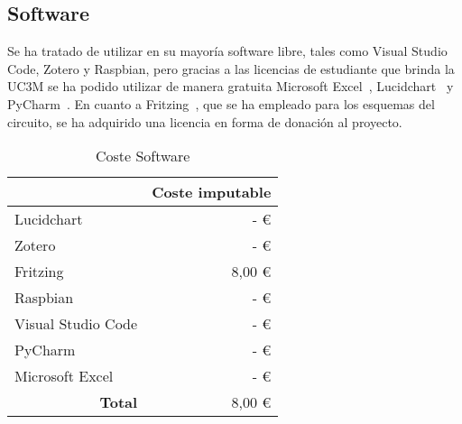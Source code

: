 \subsection{Software}\label{subsec:software}
Se ha tratado de utilizar en su mayoría software libre, tales como Visual Studio Code, Zotero y Raspbian, pero gracias a las licencias de estudiante que brinda la UC3M se ha podido utilizar de manera gratuita Microsoft Excel~\cite{microsoft_microsoft_nodate}, Lucidchart~\cite{lucidchart_usecase_nodate} y PyCharm~\cite{jetbrains_free_nodate}. En cuanto a Fritzing~\cite{fritzing_fritzing_nodate}, que se ha empleado para los esquemas del circuito, se ha adquirido una licencia en forma de donación al proyecto.

\begin{table}[H]
	\centering
	\caption{Coste Software}
	\label{tab:coste_software}
	\begin{tabular}{l|r|}
		\hline
		\rowcolor[HTML]{BFBFBF}
		\multicolumn{1}{|c|}{\cellcolor[HTML]{BFBFBF}\textbf{Descripción}} & \multicolumn{1}{c|}{\cellcolor[HTML]{BFBFBF}\textbf{Coste imputable}} \\ \hline
		\multicolumn{1}{|l|}{Lucidchart}                                   & -   €                                                                 \\ \hline
		\multicolumn{1}{|l|}{Zotero}                                       & -   €                                                                 \\ \hline
		\multicolumn{1}{|l|}{Fritzing}                                     & 8,00 €                                                                \\ \hline
		\multicolumn{1}{|l|}{Raspbian}                                     & -   €                                                                 \\ \hline
		\multicolumn{1}{|l|}{Visual Studio Code}                           & -   €                                                                 \\ \hline
		\multicolumn{1}{|l|}{PyCharm}                                      & -   €                                                                 \\ \hline
		\multicolumn{1}{|l|}{Microsoft Excel}                              & -   €                                                                 \\ \hline
		\multicolumn{1}{r|}{\textbf{Total}}                                & 8,00 €                                                                \\ \cline{2-2}
	\end{tabular}
\end{table}

